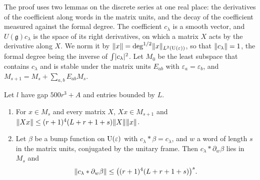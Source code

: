 The proof uses two lemmas on the discrete series at one real place: the derivatives of the coefficient along words in the matrix units, and the decay of the coefficient measured against the formal degree.
The coefficient $c_\lambda$ is a smooth vector, and $U(\mathfrak g)c_\lambda$ is the space of its right derivatives, on which a matrix $X$ acts by the derivative along $X$. We norm it by
$\lVert x\rVert=\deg^{1/2}\lVert x\rVert_{L^2(\operatorname{U}(\varepsilon))}$, so that $\lVert c_\lambda\rVert=1$, the formal degree being the inverse of $\int\lvert c_\lambda\rvert^2$. Let $M_0$ be the least subspace that contains $c_\lambda$ and is stable under the
matrix units $E_{ab}$ with $\varepsilon_a=\varepsilon_b$, and $M_{s+1}=M_s+\sum_{a,b}E_{ab}M_s$.

\begin{lemma}\label{lem:filtration-steps}
Let $l$ have gap $500r^3+A$ and entries bounded by $L$.
\begin{enumerate}[label=\textup{(\alph*)}]
\item For $x\in M_s$ and every matrix $X$, $Xx\in M_{s+1}$ and $\lVert Xx\rVert\le(r+1)^4(L+r+1+s)\lVert X\rVert\lVert x\rVert$.
\item Let $\beta$ be a bump function on $\operatorname{U}(\varepsilon)$ with $c_\lambda*\beta=c_\lambda$, and $w$ a word of length $s$ in the matrix units, conjugated by the unitary frame. Then $c_\lambda*\partial_w\beta$ lies in $M_s$ and
\[
  \lVert c_\lambda*\partial_w\beta\rVert\le\bigl((r+1)^4(L+r+1+s)\bigr)^s.
\]
\end{enumerate}
\end{lemma}

